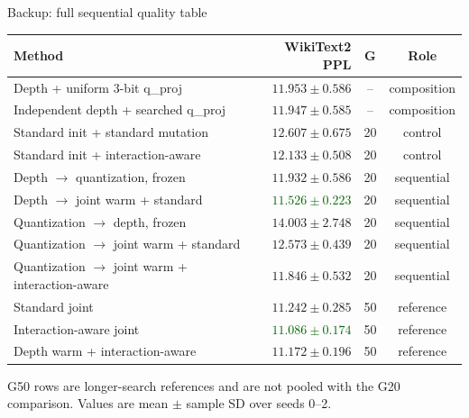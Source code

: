 \documentclass[aspectratio=169,10pt]{beamer}
\newcommand{\good}[1]{\textcolor{darkgreen}{\textbf{#1}}}
\begin{document}
\begin{frame}{Backup: full sequential quality table}
\scriptsize
\centering
\begin{tabular}{p{7.5cm}rcc}
\toprule
Method & WikiText2 PPL & G & Role \\
\midrule
Depth + uniform 3-bit q\_proj & $11.953\pm0.586$ & -- & composition \\
Independent depth + searched q\_proj & $11.947\pm0.585$ & -- & composition \\
Standard init + standard mutation & $12.607\pm0.675$ & 20 & control \\
Standard init + interaction-aware & $12.133\pm0.508$ & 20 & control \\
Depth $\rightarrow$ quantization, frozen & $11.932\pm0.586$ & 20 & sequential \\
Depth $\rightarrow$ joint warm + standard & \good{$11.526\pm0.223$} & 20 & sequential \\
Quantization $\rightarrow$ depth, frozen & $14.003\pm2.748$ & 20 & sequential \\
Quantization $\rightarrow$ joint warm + standard & $12.573\pm0.439$ & 20 & sequential \\
Quantization $\rightarrow$ joint warm + interaction-aware & $11.846\pm0.532$ & 20 & sequential \\
Standard joint & $11.242\pm0.285$ & 50 & reference \\
Interaction-aware joint & \good{$11.086\pm0.174$} & 50 & reference \\
Depth warm + interaction-aware & $11.172\pm0.196$ & 50 & reference \\
\bottomrule
\end{tabular}

\vspace{0.25cm}
{\small G50 rows are longer-search references and are not pooled with the G20 comparison. Values are mean $\pm$ sample SD over seeds 0--2.}
\end{frame}
\end{document}
